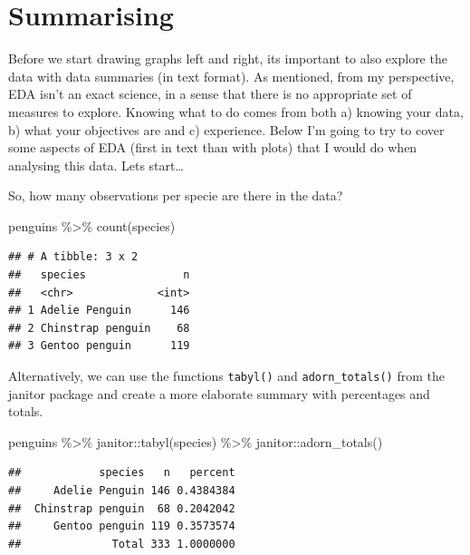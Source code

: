 \documentclass[
]{book}
\newenvironment{Shaded}{\begin{snugshade}}{\end{snugshade}}
\newcommand{\FunctionTok}[1]{\textcolor[rgb]{0.00,0.00,0.00}{#1}}
\newcommand{\NormalTok}[1]{#1}
\newcommand{\SpecialCharTok}[1]{\textcolor[rgb]{0.00,0.00,0.00}{#1}}
\begin{document}
\hypertarget{summarising}{%
\section{Summarising}\label{summarising}}

Before we start drawing graphs left and right, its important to also explore the data with data summaries (in text format).
As mentioned, from my perspective, EDA isn't an exact science, in a sense that there is no appropriate set of measures to explore.
Knowing what to do comes from both a) knowing your data, b) what your objectives are and c) experience.
Below I'm going to try to cover some aspects of EDA (first in text than with plots) that I would do when analysing this data.
Lets start\ldots{}

So, how many observations per specie are there in the data?

\begin{Shaded}
\begin{Highlighting}[]
\NormalTok{penguins }\SpecialCharTok{\%\textgreater{}\%} 
  \FunctionTok{count}\NormalTok{(species)}
\end{Highlighting}
\end{Shaded}

\begin{verbatim}
## # A tibble: 3 x 2
##   species               n
##   <chr>             <int>
## 1 Adelie Penguin      146
## 2 Chinstrap penguin    68
## 3 Gentoo penguin      119
\end{verbatim}

Alternatively, we can use the functions \texttt{tabyl()} and \texttt{adorn\_totals()} from the janitor package and create a more elaborate summary with percentages and totals.

\begin{Shaded}
\begin{Highlighting}[]
\NormalTok{penguins }\SpecialCharTok{\%\textgreater{}\%} 
\NormalTok{  janitor}\SpecialCharTok{::}\FunctionTok{tabyl}\NormalTok{(species) }\SpecialCharTok{\%\textgreater{}\%} 
\NormalTok{  janitor}\SpecialCharTok{::}\FunctionTok{adorn\_totals}\NormalTok{()}
\end{Highlighting}
\end{Shaded}

\begin{verbatim}
##            species   n   percent
##     Adelie Penguin 146 0.4384384
##  Chinstrap penguin  68 0.2042042
##     Gentoo penguin 119 0.3573574
##              Total 333 1.0000000
\end{verbatim}
\end{document}

